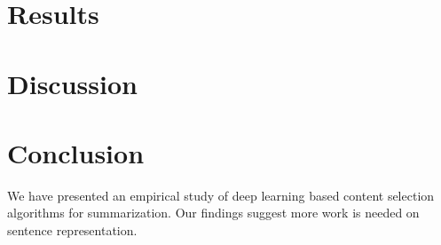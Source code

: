 \documentclass[11pt,a4paper]{article}
\newcommand{\hal}[1]{\textcolor{blue!50!red!70!white}{\textbf{[[Hal: #1]]}}}
\begin{document}
%
%

\section{Results}


\section{Discussion}



\section{Conclusion}
We have presented an empirical study of deep learning based content selection
algorithms for summarization. Our findings suggest more work is needed 
on sentence representation.





\end{document}
